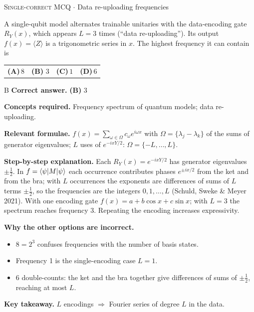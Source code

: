 \documentclass[11pt,a4paper]{article}
\newcommand{\optlabel}[1]{\textbf{(#1)}}
\newcommand{\correctlabel}[1]{\textcolor{okgreen}{\textbf{(#1)}\,\ding{51}}}
\newenvironment{qitem}[1]{\begin{list}{}{\setlength{\leftmargin}{3.3em}\setlength{\labelwidth}{3.1em}%
  \setlength{\labelsep}{0.2em}\setlength{\topsep}{3pt}\setlength{\parsep}{3pt}}\item[\textbf{Q.#1}\hfill]}{\end{list}}
\newcommand{\qsep}{\par\vspace{2pt}{\color{black!15}\hrule}\vspace{4pt}}
\newcommand{\qmeta}[2]{{\footnotesize\color{black!60}\textsc{#1} \;$\cdot$\; #2}\par}
\begin{document}
\begin{qitem}{54}
\qmeta{Single-correct MCQ}{Data re-uploading frequencies}
A single-qubit model alternates trainable unitaries with the data-encoding gate $R_Y(x)$, which appears $L = 3$ times
(``data re-uploading''). Its output $f(x) = \langle Z\rangle$ is a trigonometric series in $x$. The highest frequency it can contain is
\par\smallskip\noindent\begin{tabularx}{\linewidth}{@{}*{4}{L}@{}}
\optlabel{A}\,$8$ & \correctlabel{B}\,$3$ & \optlabel{C}\,$1$ & \optlabel{D}\,$6$
\end{tabularx}
\end{qitem}
\begin{solbox}{B}
\textbf{\color{brand}Correct answer.} \textcolor{okgreen}{\textbf{(B)}} $3$

\textbf{\color{brand}Concepts required.} Frequency spectrum of quantum models; data re-uploading.

\textbf{\color{brand}Relevant formulae.} $f(x) = \sum_{\omega\in\Omega}c_\omega e^{i\omega x}$ with $\Omega = \{\lambda_j - \lambda_k\}$ of the sums of generator eigenvalues; $L$ uses of $e^{-ixY/2}$: $\Omega = \{-L, \dots, L\}$.

\textbf{\color{brand}Step-by-step explanation.} Each $R_Y(x) = e^{-ixY/2}$ has generator eigenvalues $\pm\frac12$. In $f = \braket{\psi|M|\psi}$ each occurrence contributes
phases $e^{\pm ix/2}$ from the ket and from the bra; with $L$ occurrences the exponents are differences of sums of $L$ terms $\pm\frac12$,
so the frequencies are the integers $0, 1, \dots, L$ (Schuld, Sweke \& Meyer 2021). With one encoding gate $f(x) = a + b\cos x + c\sin x$;
with $L = 3$ the spectrum reaches frequency 3. Repeating the encoding increases expressivity.

\textbf{\color{brand}Why the other options are incorrect.}
\begin{itemize}[leftmargin=2.4em, itemsep=1pt, topsep=2pt]
\item[\textbf{(A)}] $8 = 2^3$ confuses frequencies with the number of basis states.
\item[\textbf{(C)}] Frequency 1 is the single-encoding case $L = 1$.
\item[\textbf{(D)}] $6$ double-counts: the ket and the bra together give differences of sums of $\pm\frac12$, reaching at most $L$.
\end{itemize}
\textbf{\color{brand}Key takeaway.} $L$ encodings $\Rightarrow$ Fourier series of degree $L$ in the data.
\end{solbox}
\qsep
\end{document}
